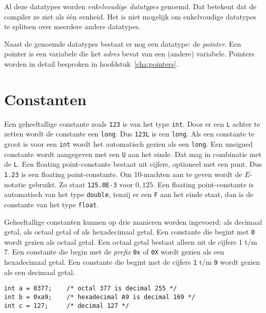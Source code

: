 Al deze datatypes worden \textsl{enkelvoudige datatypes} genoemd. Dat betekent dat de compiler ze ziet als één eenheid. Het is niet mogelijk om enkelvoudige datatypes te splitsen over meerdere andere datatypes.

Naast de genoemde datatypes bestaat er nog een datatype: de \textsl{pointer}. Een pointer is een variabele die het \textsl{adres} bevat van een (andere) variabele. Pointers worden in detail besproken in hoofdstuk~\ref{cha:pointers}.


\section{Constanten}
Een geheeltallige constante zoals \texttt{123} is van het type \texttt{int}. Door er een \texttt{L} achter te zetten wordt de constante een \texttt{long}. Dus \texttt{123L} is een \texttt{long}. Als een constante te groot is voor een \texttt{int} wordt het automatisch gezien als een \texttt{long}. Een unsigned constante wordt aangegeven met een \texttt{U} aan het einde. Dat mag in combinatie met de \texttt{L}. Een floating point-constante bestaat uit cijfers, optioneel met een punt. Dus \texttt{1.23} is een floating point-constante. Om 10-machten aan te geven wordt de $E$-notatie gebruikt. Zo staat \texttt{125.0E-3} voor $0,125$. Een floating point-constante is automatisch van het type \texttt{double}, tenzij er een \texttt{F} aan het einde staat, dan is de constante van het type \texttt{float}.

Geheeltallige constanten kunnen op drie manieren worden ingevoerd: als decimaal getal, als octaal getal of als hexadecimaal getal. Een constante die begint met \texttt{0} wordt gezien als octaal getal. Een octaal getal bestaat alleen uit de cijfers 1 t/m 7. Een constante die begin met de \textsl{prefix} \texttt{0x} of \texttt{0X} wordt gezien als een hexadecimaal getal. Een constante die begint met de cijfers \texttt{1} t/m \texttt{9} wordt gezien als een decimaal getal.

\hspace*{1em}\texttt{int a = 0377; \ \ \ /* octal 377 is decimal 255 */}\\ 
\hspace*{1em}\texttt{int b = 0xa9; \ \ \ /* hexadecimal A9 is decimal 169 */}\\ 
\hspace*{1em}\texttt{int c = 127; \ \ \ \ /* decimal 127 */}


